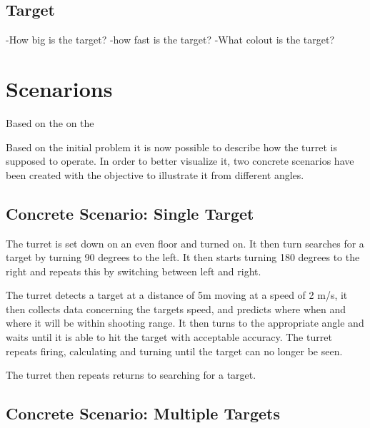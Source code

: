 \subsection{Target}
-How big is the target?
-how fast is the target?
-What colout is the target?

\section{Scenarions}
Based on the on the 


Based on the initial problem it is now possible to describe how the turret is
supposed to operate. In order to better visualize it, two concrete scenarios
have been created with the objective to illustrate it from different angles.

\subsection{Concrete Scenario: Single Target}
The turret is set down on an even floor and turned on. It then turn searches
for a target by turning 90 degrees to the left. It then starts turning 180
degrees to the right and repeats this by switching between left and right.\nl

The turret detects a target at a distance of 5m moving at a speed of 2 m/s, it
then collects data concerning the targets speed, and predicts where when and
where it will be within shooting range. It then turns to the appropriate angle
and waits until it is able to hit the target with acceptable accuracy. The
turret repeats firing, calculating and turning until the target can no longer
be seen.\nl

The turret then repeats returns to searching for a target.\nl



\subsection{Concrete Scenario: Multiple Targets}




